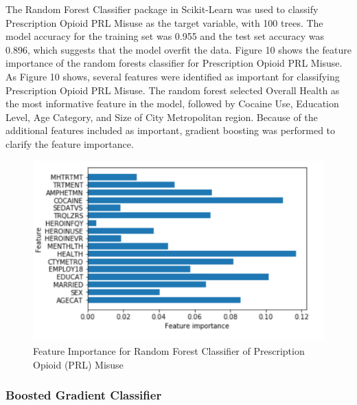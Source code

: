 \documentclass[sigconf]{acmart}
\begin{document}
The Random Forest Classifier package in Scikit-Learn was used to classify
Prescription Opioid PRL Misuse as the target variable, with 100 trees. The 
model accuracy for the training set was 0.955 and the test set accuracy was 
0.896, which suggests that the model overfit the data. Figure 10 shows the 
feature importance of the random forests classifier for Prescription Opioid 
PRL Misuse. As Figure 10 shows, several features were identified as important
for classifying Prescription Opioid PRL Misuse. The random forest selected 
Overall Health as the most informative feature in the model, followed by 
Cocaine Use, Education Level, Age Category, and Size of City Metropolitan 
region. Because of the additional features included as important, gradient 
boosting was performed to clarify the feature importance.

\begin{figure}[!ht]
  \centering\includegraphics[width=\columnwidth]{images/Figure10.pdf}
  \caption{Feature Importance for Random Forest Classifier of 
  Prescription Opioid (PRL) Misuse}
  \label{f:Figure10}
\end{figure}

\subsubsection{Boosted Gradient Classifier}
\end{document}
